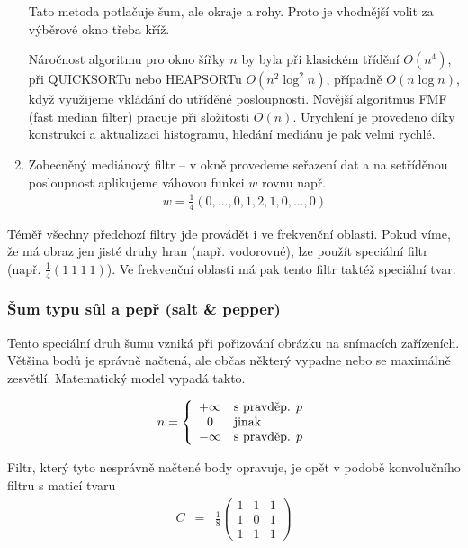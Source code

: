 \begin{enumerate}
Tato metoda
potlačuje šum, ale  okraje a rohy. Proto je vhodnější volit za výběrové okno třeba kříž. 

Náročnost algoritmu
pro okno šířky $n$ by byla při klasickém třídění $O(n^4)$, při QUICKSORTu nebo HEAPSORTu $O(n^2\log^2 n)$, případně
$O(n\log n)$, když využijeme vkládání do utříděné posloupnosti. Novější algoritmus FMF (fast median filter) pracuje při
složitosti $O(n)$. Urychlení je provedeno díky konstrukci a aktualizaci histogramu, hledání mediánu je pak velmi rychlé.

\item Zobecněný mediánový filtr -- v okně provedeme seřazení dat a na setříděnou posloupnost aplikujeme váhovou funkci $w$
 rovnu např. 
\begin{eqnarray}
w=\frac{1}{4}(0,\dots,0,1,2,1,0,\dots,0)
\end{eqnarray}
\end{enumerate}


Téměř všechny předchozí filtry jde provádět i ve frekvenční oblasti. Pokud víme, že má obraz jen jisté druhy
hran (např. vodorovné), lze použít speciální filtr (např. $\frac{1}{4}(1\ 1\ 1\ 1)$). Ve frekvenční oblasti
má pak tento filtr taktéž speciální tvar.

\subsubsection{Šum typu sůl a pepř (salt \& pepper)}

Tento speciální druh šumu vzniká při pořizování obrázku na snímacích zařízeních. Většina bodů je správně načtená, ale 
občas některý vypadne nebo se maximálně zesvětlí. Matematický model vypadá takto.

\begin{equation}
n=\left\{\begin{array}{cl}+\infty&\hbox{s pravděp. $p$}\\
0&\hbox{jinak}\\-\infty&\hbox{s pravděp. $p$}
\end{array}\right.
\end{equation}

Filtr, který tyto nesprávně načtené body opravuje, je opět v podobě konvolučního filtru s maticí tvaru
\begin{eqnarray}
C&=&\frac{1}{8}\left(\begin{array}{ccc}1&1&1\\1&0&1\\1&1&1\end{array}\right)
\end{eqnarray}

